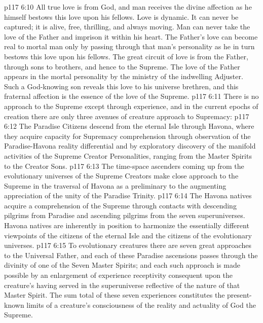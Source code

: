 \vs p117 6:10 All true love is from God, and man receives the divine affection as he himself bestows this love upon his fellows. Love is dynamic. It can never be captured; it is alive, free, thrilling, and always moving. Man can never take the love of the Father and imprison it within his heart. The Father’s love can become real to mortal man only by passing through that man’s personality as he in turn bestows this love upon his fellows. The great circuit of love is from the Father, through sons to brothers, and hence to the Supreme. The love of the Father appears in the mortal personality by the ministry of the indwelling Adjuster. Such a God\hyp{}knowing son reveals this love to his universe brethren, and this fraternal affection is the essence of the love of the Supreme.
\pc \vs p117 6:11 There is no approach to the Supreme except through experience, and in the current epochs of creation there are only three avenues of creature approach to Supremacy:
\pc \vs p117 6:12 \bibnobreakspace The Paradise Citizens descend from the eternal Isle through Havona, where they acquire capacity for Supremacy comprehension through observation of the Paradise\hyp{}Havona reality differential and by exploratory discovery of the manifold activities of the Supreme Creator Personalities, ranging from the Master Spirits to the Creator Sons.\plusone
\pc \vs p117 6:13 \bibnobreakspace The time\hyp{}space ascenders coming up from the evolutionary universes of the Supreme Creators make close approach to the Supreme in the traversal of Havona as a preliminary to the augmenting appreciation of the unity of the Paradise Trinity.
\pc \vs p117 6:14 \bibnobreakspace The Havona natives acquire a comprehension of the Supreme through contacts with descending pilgrims from Paradise and ascending pilgrims from the seven superuniverses. Havona natives are inherently in position to harmonize the essentially different viewpoints of the citizens of the eternal Isle and the citizens of the evolutionary universes.
\pc \vs p117 6:15 To evolutionary creatures there are seven great approaches to the Universal Father, and each of these Paradise ascensions passes through the divinity of one of the Seven Master Spirits; and each such approach is made possible by an enlargement of experience receptivity consequent upon the creature’s having served in the superuniverse reflective of the nature of that Master Spirit. The sum total of these seven experiences constitutes the present\hyp{}known limits of a creature’s consciousness of the reality and actuality of God the Supreme.
